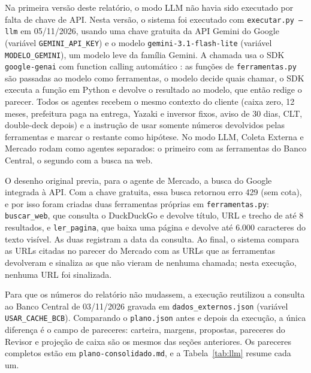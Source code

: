 \documentclass[12pt,a4paper,oneside,brazil]{abntex2}
\begin{document}
Na primeira versão deste relatório, o modo LLM não havia sido executado por falta de chave de API. Nesta versão, o sistema foi executado com \texttt{executar.py --llm} em 05/11/2026, usando uma chave gratuita da API Gemini do Google (variável \texttt{GEMINI\_API\_KEY}) e o modelo \texttt{gemini-3.1-flash-lite} (variável \texttt{MODELO\_GEMINI}), um modelo leve da família Gemini. A chamada usa o SDK \texttt{google-genai} com function calling automático \cite{google2026gemini}: as funções de \texttt{ferramentas.py} são passadas ao modelo como ferramentas, o modelo decide quais chamar, o SDK executa a função em Python e devolve o resultado ao modelo, que então redige o parecer. Todos os agentes recebem o mesmo contexto do cliente (caixa zero, 12 meses, prefeitura paga na entrega, Yazaki e inversor fixos, aviso de 30 dias, CLT, double-deck depois) e a instrução de usar somente números devolvidos pelas ferramentas e marcar o restante como hipótese. No modo LLM, Coleta Externa e Mercado rodam como agentes separados: o primeiro com as ferramentas do Banco Central, o segundo com a busca na web.

O desenho original previa, para o agente de Mercado, a busca do Google integrada à API. Com a chave gratuita, essa busca retornou erro 429 (sem cota), e por isso foram criadas duas ferramentas próprias em \texttt{ferramentas.py}: \texttt{buscar\_web}, que consulta o DuckDuckGo e devolve título, URL e trecho de até 8 resultados, e \texttt{ler\_pagina}, que baixa uma página e devolve até 6.000 caracteres do texto visível. As duas registram a data da consulta. Ao final, o sistema compara as URLs citadas no parecer do Mercado com as URLs que as ferramentas devolveram e sinaliza as que não vieram de nenhuma chamada; nesta execução, nenhuma URL foi sinalizada.

Para que os números do relatório não mudassem, a execução reutilizou a consulta ao Banco Central de 03/11/2026 gravada em \texttt{dados\_externos.json} (variável \texttt{USAR\_CACHE\_BCB}). Comparando o \texttt{plano.json} antes e depois da execução, a única diferença é o campo de pareceres: carteira, margens, propostas, pareceres do Revisor e projeção de caixa são os mesmos das seções anteriores. Os pareceres completos estão em \texttt{plano-consolidado.md}, e a Tabela~\ref{tab:llm} resume cada um.
\end{document}
